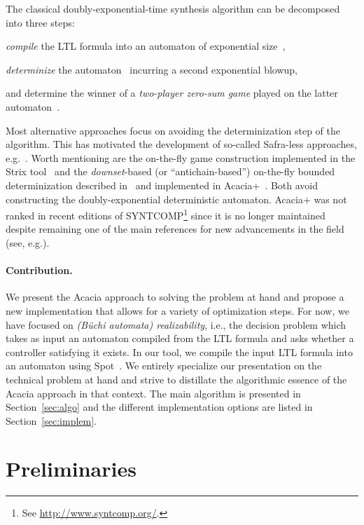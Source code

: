 \documentclass[runningheads,a4paper,draft]{llncs}
\begin{document}
The classical doubly-exponential-time synthesis algorithm can be decomposed
into three steps:
\begin{enumerate*}
  \item \emph{compile} the LTL formula into an automaton of exponential
    size~\cite{vw84},
  \item \emph{determinize} the automaton~\cite{safra88,piterman07} incurring a
    second exponential blowup,
  \item and determine the winner of a \emph{two-player zero-sum game} played
    on the latter automaton~\cite{pr89}.
\end{enumerate*}
Most alternative approaches focus on avoiding the determinization step of the
algorithm. This has motivated the development of so-called Safra-less
approaches, e.g.~\cite{kpv06,eks16,ekrs17,tushy17}. Worth mentioning are the
on-the-fly game construction implemented in the Strix tool~\cite{msl18} and
the \emph{downset}-based (or ``antichain-based'') on-the-fly bounded
determinization described in~\cite{fjr09} and implemented in
Acacia+~\cite{bbfjr12}. Both avoid constructing the doubly-exponential
deterministic automaton.  Acacia+ was not ranked in recent editions of
SYNTCOMP\footnote{See \url{http://www.syntcomp.org/}.} since it is no longer
maintained despite remaining one of the main references for new advancements
in the field (see, e.g.\cite{ffrt17,ztlpv17,apsec20,lms20,bltv20}).

\paragraph*{Contribution.}
We present the Acacia approach to solving the problem at hand and propose a
new implementation that allows for a variety of optimization steps.  For now,
we have focused on \emph{(B\"uchi automata) realizability}, i.e., the decision
problem which takes as input an automaton compiled from the LTL formula and
asks whether a controller satisfying it exists. In our tool, we compile the
input LTL formula into an automaton using Spot~\cite{duret.16.atva2}.  We
entirely specialize our presentation on the technical problem at hand and
strive to distillate the algorithmic essence of the Acacia approach in that
context. The main algorithm is presented in Section~\ref{sec:algo} and the
different implementation options are listed in Section~\ref{sec:implem}.

\section{Preliminaries}
\end{document}
